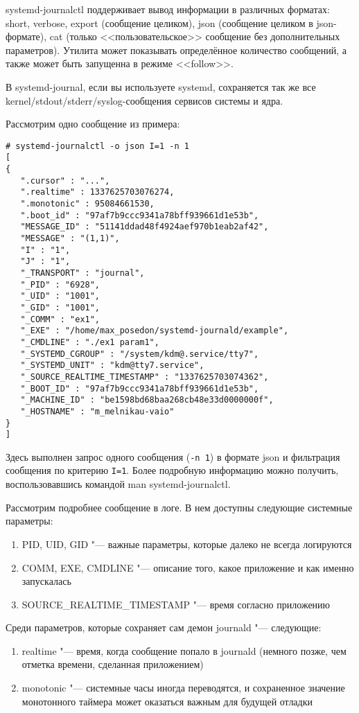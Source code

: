 \documentclass[10pt, a5paper]{article}
\begin{document}
systemd-journalctl поддерживает вывод информации в различных форматах: short, verbose, export (сообщение целиком), json (сообщение целиком в json-формате), cat (только <<пользовательское>> сообщение без дополнительных параметров). Утилита может показывать определённое количество сообщений, а также может быть запущенна в режиме <<follow>>.

В systemd-journal, если вы используете systemd, сохраняется так же все kernel/stdout/stderr/syslog-сообщения сервисов системы и ядра.

Рассмотрим одно сообщение из примера:

\begin{verbatim}
# systemd-journalctl -o json I=1 -n 1
[
{
   ".cursor" : "...",
   ".realtime" : 1337625703076274,
   ".monotonic" : 95084661530,
   ".boot_id" : "97af7b9ccc9341a78bff939661d1e53b",
   "MESSAGE_ID" : "51141ddad48f4924aef970b1eab2af42",
   "MESSAGE" : "(1,1)",
   "I" : "1",
   "J" : "1",
   "_TRANSPORT" : "journal",
   "_PID" : "6928",
   "_UID" : "1001",
   "_GID" : "1001",
   "_COMM" : "ex1",
   "_EXE" : "/home/max_posedon/systemd-journald/example",
   "_CMDLINE" : "./ex1 param1",
   "_SYSTEMD_CGROUP" : "/system/kdm@.service/tty7",
   "_SYSTEMD_UNIT" : "kdm@tty7.service",
   "_SOURCE_REALTIME_TIMESTAMP" : "1337625703074362",
   "_BOOT_ID" : "97af7b9ccc9341a78bff939661d1e53b",
   "_MACHINE_ID" : "be1598bd68baa268cb48e33d0000000f",
   "_HOSTNAME" : "m_melnikau-vaio"
}
]
\end{verbatim}

Здесь выполнен запрос одного сообщения (\verb!-n 1!) в формате json и фильтрация сообщения по критерию \verb!I=1!. Более подробную информацию можно получить, воспользовавшись командой man sys\-temd-journalctl.

Рассмотрим подробнее сообщение в логе. В нем доступны следующие системные параметры:

\begin{enumerate}
  \item PID, UID, GID "--- важные параметры, которые далеко не всегда логируются
  \item COMM, EXE, CMDLINE "--- описание того, какое приложение и как именно запускалась
  \item SOURCE\_REALTIME\_TIMESTAMP "--- время согласно приложению
\end{enumerate}

Среди параметров, которые сохраняет сам демон journald "--- следующие:

\begin{enumerate}
  \item realtime "--- время, когда сообщение попало в journald (немного позже, чем отметка времени, сделанная приложением)
  \item monotonic "--- системные часы иногда переводятся, и сохраненное значение монотонного таймера может оказаться важным для будущей отладки
\end{enumerate}
\end{document}

